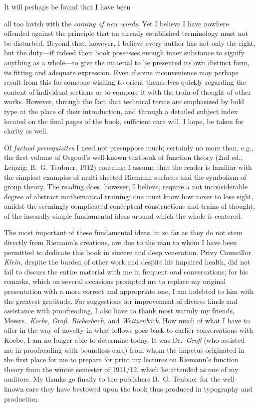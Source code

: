 \documentclass{article}
\begin{document}
It will perhaps be found that I have been

all too lavish with the \emph{coining of new words}. Yet I believe I have nowhere offended against the principle that an already established terminology must not be disturbed. Beyond that, however, I believe every author has not only the right, but the duty---if indeed their book possesses enough inner substance to signify anything as a whole---to give the material to be presented its own distinct form, its fitting and adequate expression. Even if some inconvenience may perhaps result from this for someone wishing to orient themselves quickly regarding the content of individual sections or to compare it with the train of thought of other works. However, through the fact that technical terms are emphasized by bold type at the place of their introduction, and through a detailed subject index located on the final pages of the book, sufficient care will, I hope, be taken for clarity as well.

Of \emph{factual prerequisites} I need not presuppose much; certainly no more than, e.g., the first volume of Osgood's well-known textbook of function theory (2nd ed., Leipzig: B.~G. Teubner, 1912) contains; I assume that the reader is familiar with the simplest examples of multi-sheeted Riemann surfaces and the symbolism of group theory. The reading does, however, I believe, require a not inconsiderable degree of abstract mathematical training; one must know how never to lose sight, amidst the seemingly complicated conceptual constructions and trains of thought, of the inwardly simple fundamental ideas around which the whole is centered.

The most important of these fundamental ideas, in so far as they do not stem directly from Riemann's creations, are due to the man to whom I have been permitted to dedicate this book in sincere and deep veneration. Privy Councillor \emph{Klein}, despite the burden of other work and despite his impaired health, did not fail to discuss the entire material with me in frequent oral conversations; for his remarks, which on several occasions prompted me to replace my original presentation with a more correct and appropriate one, I am indebted to him with the greatest gratitude. For suggestions for improvement of diverse kinds and assistance with proofreading, I also have to thank most warmly my friends, Messrs.~\emph{Koebe}, \emph{Groß}, \emph{Bieberbach}, and \emph{Weitzenböck}. How much of what I have to offer in the way of novelty in what follows goes back to earlier conversations with Koebe, I am no longer able to determine today. It was Dr.~\emph{Groß} (who assisted me in proofreading with boundless care) from whom the impetus originated in the first place for me to prepare for print my lectures on Riemann's function theory from the winter semester of 1911/12, which he attended as one of my auditors. My thanks go finally to the publishers B.~G. Teubner for the well-known care they have bestowed upon the book thus produced in typography and production.
\end{document}
